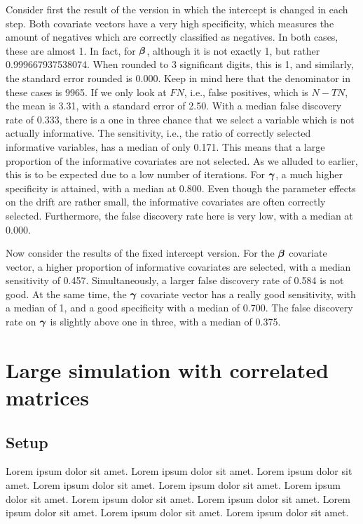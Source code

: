 Consider first the result of the version in which the intercept is changed in each step.
Both covariate vectors have a very high specificity, which measures the amount of negatives which are correctly classified as negatives.
In both cases, these are almost 1.
In fact, for $\boldsymbol{\beta}$, although it is not exactly 1, but rather 0.999667937538074.
When rounded to 3 significant digits, this is 1, and similarly, the standard error rounded is 0.000.
Keep in mind here that the denominator in these cases is 9965.
If we only look at $FN$, i.e., false positives, which is $N-TN$, the mean is 3.31, with a standard error of 2.50.
With a median false discovery rate of 0.333, there is a one in three chance that we select a variable which is not actually informative.
The sensitivity, i.e., the ratio of correctly selected informative variables, has a median of only 0.171.
This means that a large proportion of the informative covariates are not selected.
As we alluded to earlier, this is to be expected due to a low number of iterations.
For $\boldsymbol{\gamma}$, a much higher specificity is attained, with a median at 0.800.
Even though the parameter effects on the drift are rather small, the informative covariates are often correctly selected.
Furthermore, the false discovery rate here is very low, with a median at 0.000.

Now consider the results of the fixed intercept version.
For the $\boldsymbol{\beta}$ covariate vector, a higher proportion of informative covariates are selected, with a median sensitivity of 0.457.
Simultaneously, a larger false discovery rate of 0.584 is not good.
At the same time, the $\boldsymbol{\gamma}$ covariate vector has a really good sensitivity, with a median of 1, and a good specificity with a median of 0.700.
The false discovery rate on $\boldsymbol{\gamma}$ is slightly above one in three, with a median of 0.375.

\section{Large simulation with correlated matrices}
\subsection{Setup}
Lorem ipsum dolor sit amet.
Lorem ipsum dolor sit amet.
Lorem ipsum dolor sit amet.
Lorem ipsum dolor sit amet.
Lorem ipsum dolor sit amet.
Lorem ipsum dolor sit amet.
Lorem ipsum dolor sit amet.
Lorem ipsum dolor sit amet.
Lorem ipsum dolor sit amet.
Lorem ipsum dolor sit amet.
Lorem ipsum dolor sit amet.

